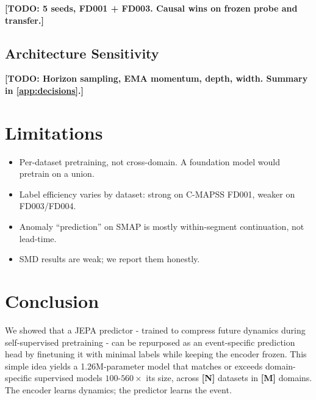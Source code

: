 \documentclass{article}
\newcommand{\placeholder}[1]{{\color{red}\textbf{[#1]}}}
\newcommand{\todo}[1]{{\color{orange}\textbf{[TODO: #1]}}}
\newcommand{\placeholder}[1]{#1}
\newcommand{\todo}[1]{}
\begin{document}
\todo{5 seeds, FD001 + FD003. Causal wins on frozen probe and transfer.}

\subsection{Architecture Sensitivity}
\label{sec:arch_sensitivity}

\todo{Horizon sampling, EMA momentum, depth, width. Summary in \cref{app:decisions}.}

\section{Limitations}
\label{sec:limitations}

\begin{itemize}[nosep]
  \item Per-dataset pretraining, not cross-domain. A foundation model would pretrain on a union.
  \item Label efficiency varies by dataset: strong on C-MAPSS FD001, weaker on FD003/FD004.
  \item Anomaly ``prediction'' on SMAP is mostly within-segment continuation, not lead-time.
  \item SMD results are weak; we report them honestly.
\end{itemize}

\section{Conclusion}

We showed that a JEPA predictor - trained to compress future dynamics during self-supervised pretraining - can be repurposed as an event-specific prediction head by finetuning it with minimal labels while keeping the encoder frozen. This simple idea yields a 1.26M-parameter model that matches or exceeds domain-specific supervised models $100$-$560\times$ its size, across \placeholder{N} datasets in \placeholder{M} domains. The encoder learns dynamics; the predictor learns the event.



\end{document}

